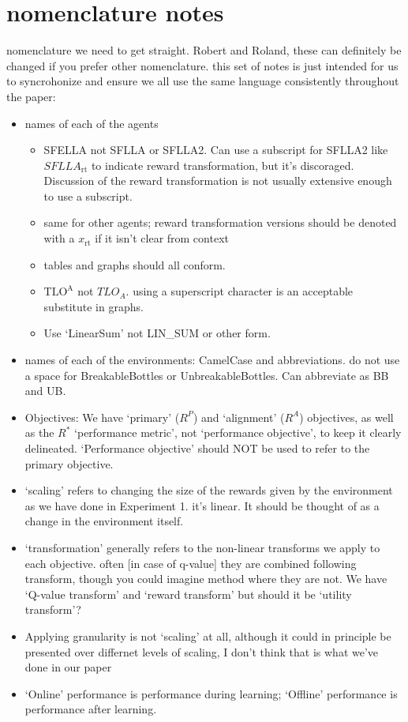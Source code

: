\section*{nomenclature notes}
nomenclature we need to get straight. Robert and Roland, these can definitely be changed if you prefer other nomenclature. this set of notes is just intended for us to syncrohonize and ensure we all use the same language consistently throughout the paper:

\begin{itemize}
    \item names of each of the agents
        \begin{itemize}
            \item SFELLA not SFLLA or SFLLA2. Can use a subscript for SFLLA2 like $SFLLA_{\text{rt}}$ to indicate reward transformation, but it's discoraged. Discussion of the reward transformation is not usually extensive enough to use a subscript. 
            \item same for other agents; reward transformation versions should be denoted with a $x_{\text{rt}}$ if it isn't clear from context
            \item tables and graphs should all conform.
            \item $\text{TLO}^\text{A}$ not $TLO_A$. using a superscript character is an acceptable substitute in graphs.
            \item Use `LinearSum' not LIN\_SUM or other form.
        \end{itemize}
    \item names of each of the environments: CamelCase and abbreviations. do not use a space for BreakableBottles or UnbreakableBottles. Can abbreviate as BB and UB. 
    \item Objectives: We have `primary' ($R^P$) and `alignment' ($R^A$) objectives, as well as the $R^*$ `performance metric', not `performance objective', to keep it clearly delineated. `Performance objective' should NOT be used to refer to the primary objective.
    \item `scaling' refers to changing the size of the rewards given by the environment as we have done in Experiment 1. it's linear. It should be thought of as a change in the environment itself.
    \item `transformation' generally refers to the non-linear transforms we apply to each objective. often [in case of q-value] they are combined following transform, though you could imagine method where they are not. We have `Q-value transform' and `reward transform' but should it be `utility transform'?
    \item Applying granularity is not `scaling' at all, although it could in principle be presented over differnet levels of scaling, I don't think that is what we've done in our paper
    \item `Online' performance is performance during learning; `Offline' performance is performance after learning.
\end{itemize}

